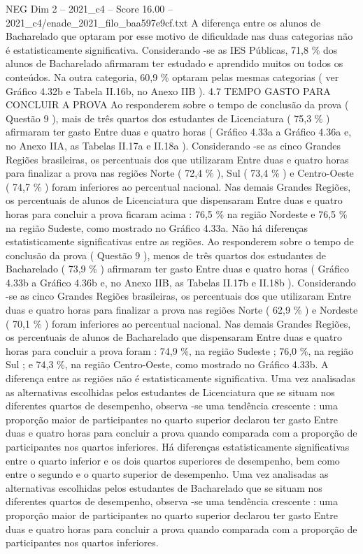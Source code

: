 \begin{textsample}{NEG Dim 2 – 2021\_c4 – Score 16.00 – 2021\_c4/enade\_2021\_filo\_baa597e9cf.txt}
A diferença entre os alunos de Bacharelado que optaram por esse motivo de dificuldade nas duas categorias não é estatisticamente significativa.
Considerando -se as IES Públicas, 71,8 \% dos alunos de Bacharelado afirmaram ter estudado e aprendido muitos ou todos os conteúdos.
Na outra categoria, 60,9 \% optaram pelas mesmas categorias ( ver Gráfico 4.32b e Tabela II.16b, no Anexo IIB ). 4.7 TEMPO GASTO PARA CONCLUIR A PROVA Ao responderem sobre o tempo de conclusão da prova ( Questão 9 ), mais de três quartos dos estudantes de Licenciatura ( 75,3 \% ) afirmaram ter gasto Entre duas e quatro horas ( Gráfico 4.33a a Gráfico 4.36a e, no Anexo IIA, as Tabelas II.17a e II.18a ).
Considerando -se as cinco Grandes Regiões brasileiras, os percentuais dos que utilizaram Entre duas e quatro horas para finalizar a prova nas regiões Norte ( 72,4 \% ), Sul ( 73,4 \% ) e Centro-Oeste ( 74,7 \% ) foram inferiores ao percentual nacional.
Nas demais Grandes Regiões, os percentuais de alunos de Licenciatura que dispensaram Entre duas e quatro horas para concluir a prova ficaram acima : 76,5 \% na região Nordeste e 76,5 \% na região Sudeste, como mostrado no Gráfico 4.33a.
Não há diferenças estatisticamente significativas entre as regiões.
Ao responderem sobre o tempo de conclusão da prova ( Questão 9 ), menos de três quartos dos estudantes de Bacharelado ( 73,9 \% ) afirmaram ter gasto Entre duas e quatro horas ( Gráfico 4.33b a Gráfico 4.36b e, no Anexo IIB, as Tabelas II.17b e II.18b ).
Considerando -se as cinco Grandes Regiões brasileiras, os percentuais dos que utilizaram Entre duas e quatro horas para finalizar a prova nas regiões Norte ( 62,9 \% ) e Nordeste ( 70,1 \% ) foram inferiores ao percentual nacional.
Nas demais Grandes Regiões, os percentuais de alunos de Bacharelado que dispensaram Entre duas e quatro horas para concluir a prova foram : 74,9 \%, na região Sudeste ; 76,0 \%, na região Sul ; e 74,3 \%, na região Centro-Oeste, como mostrado no Gráfico 4.33b.
A diferença entre as regiões não é estatisticamente significativa.
Uma vez analisadas as alternativas escolhidas pelos estudantes de Licenciatura que se situam nos diferentes quartos de desempenho, observa -se uma tendência crescente : uma proporção maior de participantes no quarto superior declarou ter gasto Entre duas e quatro horas para concluir a prova quando comparada com a proporção de participantes nos quartos inferiores.
Há diferenças estatisticamente significativas entre o quarto inferior e os dois quartos superiores de desempenho, bem como entre o segundo e o quarto superior de desempenho.
Uma vez analisadas as alternativas escolhidas pelos estudantes de Bacharelado que se situam nos diferentes quartos de desempenho, observa -se uma tendência crescente : uma proporção maior de participantes no quarto superior declarou ter gasto Entre duas e quatro horas para concluir a prova quando comparada com a proporção de participantes nos quartos inferiores.

\end{textsample}
